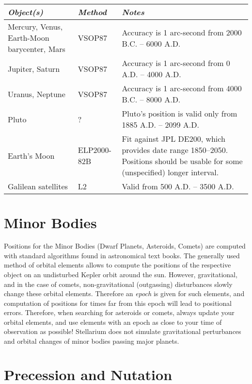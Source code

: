 \newpage
\begin{longtabu} to \textwidth {X|l|X}
\toprule
\emph{Object(s)} & \emph{Method} & \emph{Notes}\tabularnewline
\midrule
Mercury, Venus, Earth-Moon barycenter, Mars & VSOP87 & Accuracy is 1 arc-second from 2000 B.C. -- 6000 A.D. \\\midrule
Jupiter, Saturn                             & VSOP87 & Accuracy is 1 arc-second from 0 A.D. -- 4000 A.D.    \\\midrule
Uranus, Neptune                             & VSOP87 & Accuracy is 1 arc-second from 4000 B.C. -- 8000 A.D. \\\midrule
Pluto                                       & ?      & Pluto's position is valid only from 1885 A.D. -- 2099 A.D.\\\midrule
Earth's Moon                                & ELP2000-82B & Fit against JPL DE200, which provides date range 1850--2050. 
                                                            Positions should be usable for some (unspecified) longer interval. \\\midrule
Galilean satellites                         & L2     & Valid from 500 A.D. -- 3500 A.D.\\ %
\bottomrule
\end{longtabu}


\section{Minor Bodies}
\label{sec:Accuracy:MinorBodies}

Positions for the Minor Bodies (Dwarf Planets, Asteroids, Comets) are
computed with standard algorithms found in astronomical text
books. The generally used method of orbital elements allows to compute
the positions of the respective object on an undisturbed Kepler orbit
around the sun. However, gravitational, and in the case of comets,
non-gravitational (outgassing) disturbances slowly change these
orbital elements. Therefore an \emph{epoch} is given for such
elements, and computation of positions for times far from this epoch
will lead to positional errors. Therefore, when searching for
asteroids or comets, always update your orbital elements, and use
elements with an epoch as close to your time of observation as
possible! Stellarium does not simulate gravitational perturbances and
orbital changes of minor bodies passing major planets.

\section{Precession and Nutation}
\label{sec:Accuracy:Precession}

